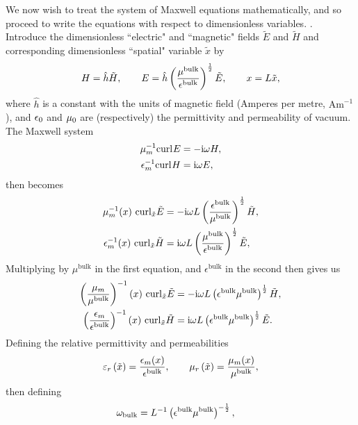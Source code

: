 We now wish to treat the system of Maxwell equations mathematically, and so proceed to write the equations with respect to dimensionless variables. .
Introduce the dimensionless ``electric" and ``magnetic" fields $\tilde{E}$ and $\tilde{H}$ and corresponding dimensionless ``spatial" variable $\tilde{x}$ by
\begin{align*}
	H = \hat{h}\tilde{H}, 
	\qquad E = \hat{h}\left( \frac{\mu^{\mathrm{bulk}}}{\epsilon^{\mathrm{bulk}}} \right)^{\frac{1}{2}}\tilde{E},
	\qquad x = L\tilde{x},
\end{align*}
where $\hat{h}$ is a constant with the units of magnetic field (Amperes per metre, $\mathrm{A}\mathrm{m}^{-1}$), and $\epsilon_0$ and $\mu_0$ are (respectively) the permittivity and permeability of vacuum.
The Maxwell system
\begin{align*}
	\mu_m^{-1}\mathrm{curl}_{}E &= -\mathrm{i}\omega H, \\
	\epsilon_m^{-1}\mathrm{curl}_{}H &= \mathrm{i}\omega E,
\end{align*}
then becomes
\begin{align*}
	\mu_m^{-1}(x) \ \mathrm{curl}_{\tilde{x}}\tilde{E} 
	&= -\mathrm{i}\omega L\left( \frac{\epsilon^{\mathrm{bulk}}}{\mu^{\mathrm{bulk}}} \right)^{\frac{1}{2}} \tilde{H}, \\
	\epsilon_m^{-1}(x) \ \mathrm{curl}_{\tilde{x}}\tilde{H} 
	&= \mathrm{i}\omega L\left( \frac{\mu^{\mathrm{bulk}}}{\epsilon^{\mathrm{bulk}}} \right)^{\frac{1}{2}} \tilde{E},
\end{align*}
Multiplying by $\mu^{\mathrm{bulk}}$ in the first equation, and $\epsilon^{\mathrm{bulk}}$ in the second then gives us
\begin{align*}
	\bracs{\frac{\mu_m}{\mu^{\mathrm{bulk}}}}^{-1}(x) \ \curl{\tilde{x}}\tilde{E} 
	&= -\rmi\omega L\bracs{\epsilon^{\mathrm{bulk}}\mu^{\mathrm{bulk}}}^{\recip{2}} \tilde{H}, \\
	\bracs{\frac{\epsilon_m}{\epsilon^{\mathrm{bulk}}}}^{-1}(x) \ \curl{\tilde{x}}\tilde{H} 
	&= \rmi\omega L\bracs{\epsilon^{\mathrm{bulk}}\mu^{\mathrm{bulk}}}^{\recip{2}} \tilde{E}.
\end{align*}
Defining the relative permittivity and permeabilities
\begin{align*}
	\varepsilon_r\left( \tilde{x} \right) = \frac{\epsilon_m(x)}{\epsilon^{\mathrm{bulk}}},
	\qquad \mu_r\left( \tilde{x} \right) = \frac{\mu_m(x)}{\mu^{\mathrm{bulk}}},
\end{align*}
then defining
\begin{align*}
	\omega_{\mathrm{bulk}}
	&= L^{-1}\left( \epsilon^{\mathrm{bulk}}\mu^{\mathrm{bulk}} \right)^{-\frac{1}{2}},
\end{align*}
